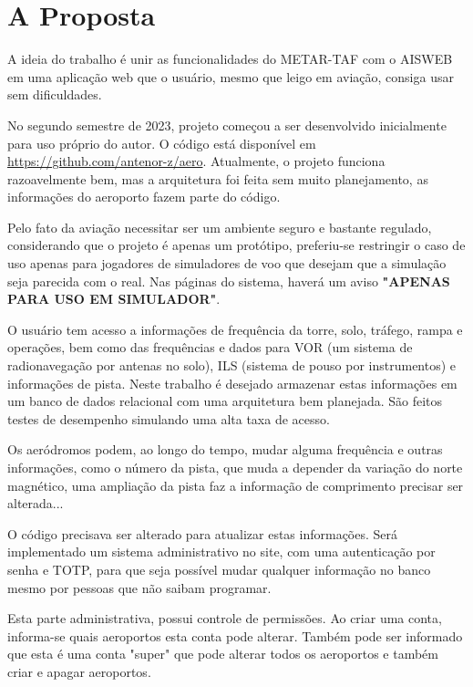\chapter{A Proposta}
A ideia do trabalho é unir as funcionalidades do METAR-TAF com o AISWEB em uma 
aplicação web que o usuário, mesmo que leigo em aviação, consiga usar sem 
dificuldades.

No segundo semestre de 2023, projeto começou a ser desenvolvido inicialmente para uso próprio do autor.
O código está disponível em \url{https://github.com/antenor-z/aero}. Atualmente, o
projeto funciona razoavelmente bem, mas a arquitetura foi feita sem muito planejamento, as
informações do aeroporto fazem parte do código.

Pelo fato da aviação necessitar ser um ambiente seguro e bastante regulado, considerando
que o projeto é apenas um protótipo, preferiu-se restringir o caso de uso apenas
para jogadores de simuladores de voo que desejam que a simulação seja parecida
com o real. Nas páginas do sistema, haverá um aviso \textbf{"APENAS PARA USO EM SIMULADOR"}.

O usuário tem acesso a informações de frequência da torre, solo, tráfego, rampa
e operações, bem como das frequências e dados para VOR (um sistema de radionavegação
por antenas no solo), ILS (sistema de pouso por instrumentos) e informações de 
pista. Neste trabalho é desejado armazenar estas informações em um banco de dados relacional com 
uma arquitetura bem planejada. São feitos testes de desempenho simulando uma alta taxa 
de acesso.

Os aeródromos podem, ao longo do tempo, mudar alguma frequência e outras
informações, como o número da pista, que muda a depender da variação do norte 
magnético, uma ampliação da pista faz a informação de comprimento precisar ser 
alterada...

O código precisava ser alterado para atualizar estas informações. Será implementado
 um sistema administrativo no site, com uma autenticação por senha e TOTP, para 
 que seja possível mudar qualquer informação no banco mesmo por pessoas que não 
 saibam programar.

Esta parte administrativa, possui controle de permissões. Ao criar uma conta, 
informa-se quais aeroportos esta conta pode alterar. Também pode ser informado que
  esta é uma conta "super" que pode alterar todos os aeroportos e também criar e 
  apagar aeroportos.
